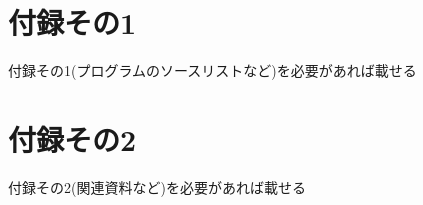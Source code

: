 \documentclass{funthesis}
\begin{document}
\appendix

\chapter*{付録その1} %

付録その1(プログラムのソースリストなど)を必要があれば載せる

\chapter*{付録その2}

付録その2(関連資料など)を必要があれば載せる

\listoffigures

\listoftables
\end{document}
